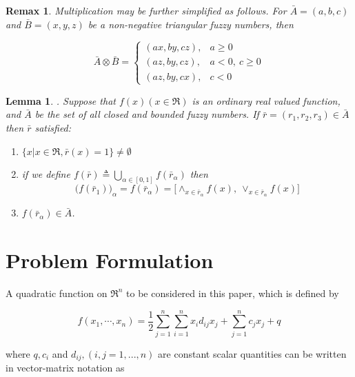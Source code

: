 \documentclass{iaesarticle3}
\newtheorem{rem}{Remax}
\newtheorem{lem}{Lemma}
\begin{document}
\begin{rem}
    Multiplication may be further simplified as follows. For $\bar{A} = (a, b, c)$ and $\bar{B} = (x, y, z)$ be a non-negative triangular fuzzy numbers, then

    \begin{displaymath}
        \bar{A}\otimes \bar{B} =
        \left \{ \begin{array}{ll}
        (ax, by, cz),& a \geq 0 \\
        (az, by, cz), & a<0,\ c\geq 0\\
        (az, by, cx), & c<0
        \end{array} \right.
    \end{displaymath}
\end{rem}
\begin{lem}
    \cite{zoh}. Suppose that $f(x) (x \in \Re)$ is an ordinary real valued function, and $\bar{A}$ be the set of all closed and bounded fuzzy numbers. If $\bar{r} =(r_1,r_2,r_3) \in \bar{A}$ then $\bar{r}$ satisfied:

\begin{enumerate}
    \item $\{x| x \in \Re, \bar{r}(x) = 1\} \neq \emptyset$
    \item if we define $f(\bar{r}) \triangleq \bigcup_{\alpha \in [0,1]}f(\bar{r}_\alpha)$ then
    \begin{displaymath}
        \Big(f(\bar{r}_1)\Big)_\alpha = f(\bar{r}_\alpha) = \Big[\wedge_{x \in \bar{r}_\alpha} f(x),\ \vee_{x\in \bar{r}_\alpha} f(x) \Big]
    \end{displaymath}
    \item $f(\bar{r}_\alpha) \in \bar{A}$.
\end{enumerate}
\end{lem}

\section{Problem Formulation}
A quadratic function on $\Re^n$ to be considered in this paper, which is defined by

\begin{equation}\label{pers1}
    f(x_1,\cdots, x_n) = \frac{1}{2} \sum_{j=1}^n \sum_{i=1}^n x_id_{ij} x_j + \sum_{j=1}^nc_jx_j + q
\end{equation}

where $q, c_i$ and $d_{ij}, (i,j=1,...,n)$ are constant scalar quantities can be written in vector-matrix notation as
\end{document}
